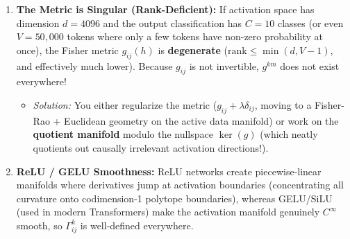 \documentclass[11pt,a4paper]{article}
\begin{document}
\begin{enumerate}[leftmargin=*]
    \item \textbf{The Metric is Singular (Rank-Deficient):} If activation space has dimension $d = 4096$ and the output classification has $C = 10$ classes (or even $V = 50,000$ tokens where only a few tokens have non-zero probability at once), the Fisher metric $g_{ij}(h)$ is \textbf{degenerate} ($\text{rank} \le \min(d, V-1)$, and effectively much lower). Because $g_{ij}$ is not invertible, $g^{km}$ does not exist everywhere!
    \begin{itemize}
        \item \emph{Solution:} You either regularize the metric ($g_{ij} + \lambda \delta_{ij}$, moving to a Fisher-Rao + Euclidean geometry on the active data manifold) or work on the \textbf{quotient manifold} modulo the nullspace $\ker(g)$ (which neatly quotients out causally irrelevant activation directions!).
    \end{itemize}
    \item \textbf{ReLU / GELU Smoothness:} ReLU networks create piecewise-linear manifolds where derivatives jump at activation boundaries (concentrating all curvature onto codimension-1 polytope boundaries), whereas GELU/SiLU (used in modern Transformers) make the activation manifold genuinely $C^\infty$ smooth, so $\Gamma^k_{ij}$ is well-defined everywhere.
\end{enumerate}
\end{document}
